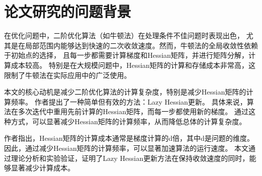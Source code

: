 \documentclass[a4paper,twoside,AutoFakeBold]{article}
\theoremstyle{definition}
\begin{document}
\songti\xiaosi
%
\section{论文研究的问题背景}
在优化问题中，二阶优化算法（如牛顿法）在处理条件不佳问题时表现出色，
尤其是在局部范围内能够达到快速的二次收敛速度。然而，牛顿法的全局收敛性依赖于初始点的选择，
且每一步都需要计算梯度和Hessian矩阵，并进行矩阵分解，计算成本较高。
特别是在大规模问题中，Hessian矩阵的计算和存储成本非常高，这限制了牛顿法在实际应用中的广泛使用。

本文的核心动机是减少二阶优化算法的计算复杂度，特别是减少Hessian矩阵的计算频率。
作者提出了一种简单但有效的方法：Lazy Hessian更新。
具体来说，算法在多次迭代中重用先前计算的Hessian矩阵，而每一步都使用新的梯度。
通过这种方式，可以显著减少Hessian矩阵的计算频率，从而降低总体的计算复杂度。

作者指出，Hessian矩阵的计算成本通常是梯度计算的d倍，其中d是问题的维度。
因此，通过减少Hessian矩阵的计算频率，可以显著加速算法的运行速度。
本文通过理论分析和实验验证，证明了Lazy Hessian更新方法在保持收敛速度的同时，能够显著减少计算成本。

\newpage
\end{document}
